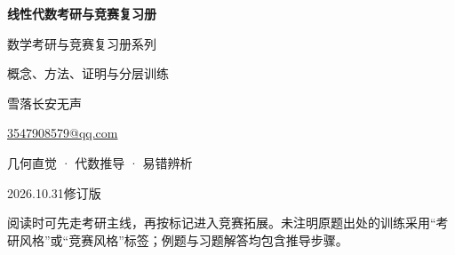 \thispagestyle{empty}\vspace*{32mm}
\begin{center}
{\LARGE\bfseries 线性代数考研与竞赛复习册}\par\vspace{15mm}
数学考研与竞赛复习册系列\par
概念、方法、证明与分层训练\par\vspace{22mm}
{\large 雪落长安无声}\par\vspace{6mm}
\href{mailto:3547908579@qq.com}{3547908579@qq.com}\par\vspace{18mm}
几何直觉 · 代数推导 · 易错辨析\par\vspace{12mm}
2026.10.31\quad 修订版
\end{center}\vfill
阅读时可先走考研主线，再按标记进入竞赛拓展。未注明原题出处的训练采用“考研风格”或“竞赛风格”标签；例题与习题解答均包含推导步骤。
